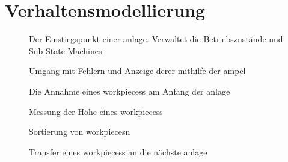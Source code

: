 

\section{Verhaltensmodellierung}\label{sec:verhaltensmodellierung}

\begin{figure}
    \caption{Der Einstiegspunkt einer \gls{anlage}.
    Verwaltet die Betriebszustände und Sub-State Machines}
    \label{fig:stm_top_level}
\end{figure}

\begin{figure}
    \caption{Umgang mit Fehlern und Anzeige derer mithilfe der \gls{ampel}}
    \label{fig:stm_error}
\end{figure}

\begin{figure}
    \caption{Die Annahme eines \glspl{workpiece}s am Anfang der \gls{anlage}}
    \label{fig:stm_recieve_workpiece}
\end{figure}

\begin{figure}
    \caption{Messung der Höhe eines \glspl{workpiece}s}
    \label{fig:stm_hoehe_messen}
\end{figure}

\begin{figure}
    \caption{Sortierung von \glspl{workpiece}n}
    \label{fig:stm_sort_workpiece}
\end{figure}

\begin{figure}
    \caption{Transfer eines \glspl{workpiece}s an die nächste \gls{anlage}}
    \label{fig:stm_workpiece_transfer}
\end{figure}


